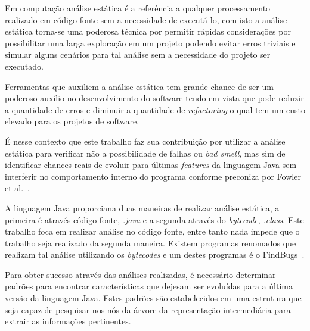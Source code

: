 Em computa\c{c}\~{a}o an\'{a}lise est\'{a}tica \'{e} a refer\^{e}ncia a qualquer processamento realizado em c\'{o}digo fonte sem a necessidade de execut\'{a}-lo, com isto a an\'{a}lise est\'{a}tica torna-se uma poderosa t\'{e}cnica por permitir r\'{a}pidas considera\c{c}\~{o}es por possibilitar uma larga explora\c{c}\~{a}o em um projeto podendo evitar erros triviais e simular alguns cen\'{a}rios para tal an\'{a}lise sem a necessidade do projeto ser executado.

Ferramentas que auxiliem a an\'{a}lise est\'{a}tica tem grande chance de ser um poderoso aux\'{i}lio no desenvolvimento do software tendo em vista que pode reduzir a quantidade de erros e diminuir a quantidade de \textit{refactoring} o qual tem um custo elevado para os projetos de software.

\'{E} nesse contexto que este trabalho faz sua contribui\c{c}\~{a}o por utilizar a an\'{a}lise est\'{a}tica para verificar n\~{a}o a possibilidade de falhas ou \textit{bad smell}, mas sim de identificar chances reais de evoluir para \'{u}ltimas \textit{features} da linguagem Java sem interferir no comportamento interno do programa conforme preconiza por Fowler et al.~\cite{martinFowlerRafactoring}.

A linguagem Java proporciana duas maneiras de realizar an\'{a}lise est\'{a}tica, a primeira \'{e} através c\'{o}digo fonte, \textit{.java} e a segunda atrav\'{e}s do \textit{bytecode}, \textit{.class}. Este trabalho foca em realizar an\'{a}lise no c\'{o}digo fonte, entre tanto nada impede que o trabalho seja realizado da segunda maneira. Existem programas renomados que realizam tal an\'{a}lise utilizando os \textit{bytecodes} e um destes programas \'{e} o FindBugs~\cite{FindBugs}.


Para obter sucesso atrav\'{e}s das an\'{a}lises realizadas, \'{e} necess\'{a}rio determinar padr\~{o}es para encontrar caracter\'{i}sticas que dejesam ser evolu\'{i}das para a \'{u}ltima vers\~{a}o da linguagem Java. Estes padr\~{o}es s\~{a}o estabelecidos em uma estrutura que seja capaz de pesquisar nos n\'{o}s da \'{a}rvore da representa\c{c}\~{a}o intermedi\'{a}ria para extrair as informa\c{c}\~{o}es pertinentes.


